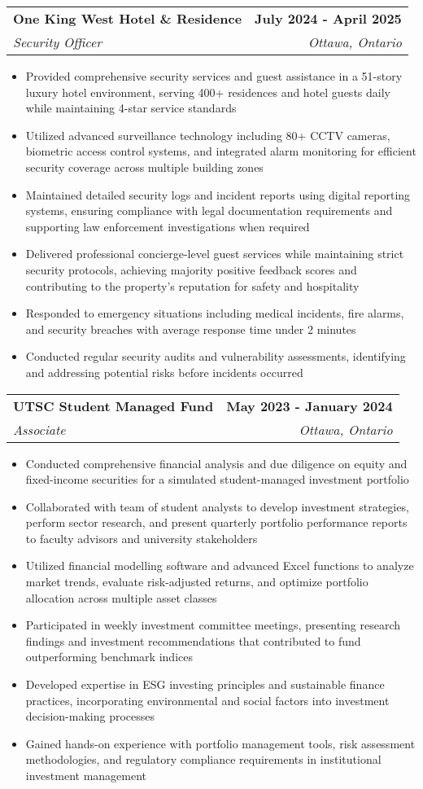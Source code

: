 \documentclass[letterpaper,11pt]{article}
\makeatletter
\newcommand{\resumeItem}[1]{
  \item\small{
    {#1 \vspace{-2pt}}
  }
}
\newcommand{\resumeSubheading}[4]{
  \vspace{-2pt}\item
    \begin{tabular*}{1.0\textwidth}[t]{l@{\extracolsep{\fill}}r}
      \textbf{#1} & \textbf{\small #2} \\
      \textit{\small#3} & \textit{\small #4} \\
    \end{tabular*}\vspace{-7pt}
}
\newcommand{\resumeItemListStart}{\begin{itemize}}
\newcommand{\resumeItemListEnd}{\end{itemize}\vspace{-5pt}}
\makeatother
\begin{document}
    \resumeSubheading
      {One King West Hotel \& Residence}{July 2024 - April 2025}
      {Security Officer}{Ottawa, Ontario}
      \resumeItemListStart
        \resumeItem{Provided comprehensive security services and guest assistance in a 51-story luxury hotel environment, serving 400+ residences and hotel guests daily while maintaining 4-star service standards}
        \resumeItem{Utilized advanced surveillance technology including 80+ CCTV cameras, biometric access control systems, and integrated alarm monitoring for efficient security coverage across multiple building zones}
        \resumeItem{Maintained detailed security logs and incident reports using digital reporting systems, ensuring compliance with legal documentation requirements and supporting law enforcement investigations when required}
        \resumeItem{Delivered professional concierge-level guest services while maintaining strict security protocols, achieving majority positive feedback scores and contributing to the property's reputation for safety and hospitality}
        \resumeItem{Responded to emergency situations including medical incidents, fire alarms, and security breaches with average response time under 2 minutes}
        \resumeItem{Conducted regular security audits and vulnerability assessments, identifying and addressing potential risks before incidents occurred}
    \resumeItemListEnd

    \resumeSubheading
      {UTSC Student Managed Fund}{May 2023 - January 2024}
      {Associate}{Ottawa, Ontario}
      \resumeItemListStart
        \resumeItem{Conducted comprehensive financial analysis and due diligence on equity and fixed-income securities for a simulated student-managed investment portfolio}
        \resumeItem{Collaborated with team of student analysts to develop investment strategies, perform sector research, and present quarterly portfolio performance reports to faculty advisors and university stakeholders}
        \resumeItem{Utilized financial modelling software and advanced Excel functions to analyze market trends, evaluate risk-adjusted returns, and optimize portfolio allocation across multiple asset classes}
        \resumeItem{Participated in weekly investment committee meetings, presenting research findings and investment recommendations that contributed to fund outperforming benchmark indices}
        \resumeItem{Developed expertise in ESG investing principles and sustainable finance practices, incorporating environmental and social factors into investment decision-making processes}
        \resumeItem{Gained hands-on experience with portfolio management tools, risk assessment methodologies, and regulatory compliance requirements in institutional investment management}
      \resumeItemListEnd
\end{document}
